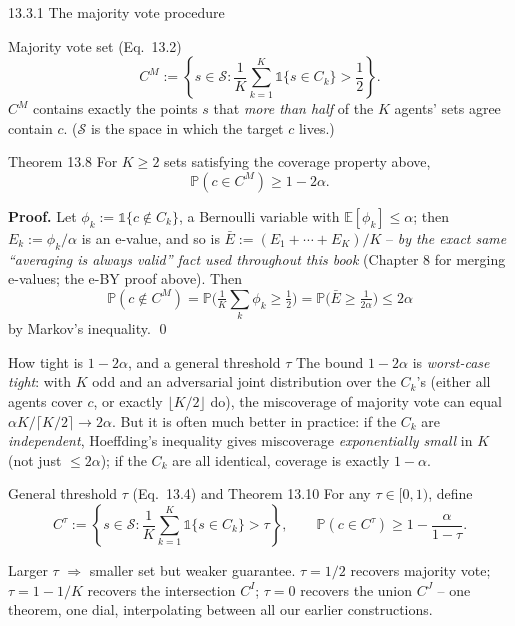 \documentclass[aspectratio=169,10pt]{beamer}
\newcommand{\E}{\mathbb{E}}
\newcommand{\Pb}{\mathbb{P}}
\newcommand{\calS}{\mathcal{S}}
\begin{document}
\begin{frame}{13.3.1 The majority vote procedure}
  \begin{block}{Majority vote set (Eq.\ 13.2)}
    \[
      C^M := \left\{ s \in \calS : \frac1K\sum_{k=1}^K \mathbb{1}\{s\in C_k\} > \frac12 \right\}.
    \]
    $C^M$ contains exactly the points $s$ that \emph{more than half} of the $K$ agents' sets agree contain $c$. ($\calS$ is the space in which the target $c$ lives.)
  \end{block}

  \begin{block}{Theorem 13.8}
    For $K\geq2$ sets satisfying the coverage property above,
    \[
      \Pb(c \in C^M) \geq 1-2\alpha.
    \]
  \end{block}

  \textbf{Proof.} Let $\phi_k := \mathbb{1}\{c\notin C_k\}$, a Bernoulli variable with $\E[\phi_k]\leq\alpha$; then $E_k:=\phi_k/\alpha$ is an e-value, and so is $\bar E:=(E_1+\cdots+E_K)/K$ -- \emph{by the exact same ``averaging is always valid'' fact used throughout this book} (Chapter 8 for merging e-values; the e-BY proof above). Then
  \[
    \Pb(c\notin C^M) = \Pb\Big(\tfrac1K\sum_k\phi_k \geq \tfrac12\Big) = \Pb\big(\bar E \geq \tfrac1{2\alpha}\big) \leq 2\alpha
  \]
  by Markov's inequality. \qed
\end{frame}

\begin{frame}{How tight is $1-2\alpha$, and a general threshold $\tau$}
  The bound $1-2\alpha$ is \emph{worst-case tight}: with $K$ odd and an adversarial joint distribution over the $C_k$'s (either all agents cover $c$, or exactly $\lfloor K/2\rfloor$ do), the miscoverage of majority vote can equal $\alpha K/\lceil K/2\rceil \to 2\alpha$. But it is often much better in practice: if the $C_k$ are \emph{independent}, Hoeffding's inequality gives miscoverage \emph{exponentially small} in $K$ (not just $\le2\alpha$); if the $C_k$ are all identical, coverage is exactly $1-\alpha$.

  \begin{block}{General threshold $\tau$ (Eq.\ 13.4) and Theorem 13.10}
    For any $\tau\in[0,1)$, define
    \[
      C^\tau := \left\{s\in\calS : \frac1K\sum_{k=1}^K\mathbb{1}\{s\in C_k\} > \tau\right\}, \qquad \Pb(c\in C^\tau) \geq 1-\frac{\alpha}{1-\tau}.
    \]
  \end{block}
  Larger $\tau$ $\Rightarrow$ smaller set but weaker guarantee. $\tau=1/2$ recovers majority vote; $\tau=1-1/K$ recovers the intersection $C^I$; $\tau=0$ recovers the union $C^J$ -- one theorem, one dial, interpolating between all our earlier constructions.
\end{frame}
\end{document}
